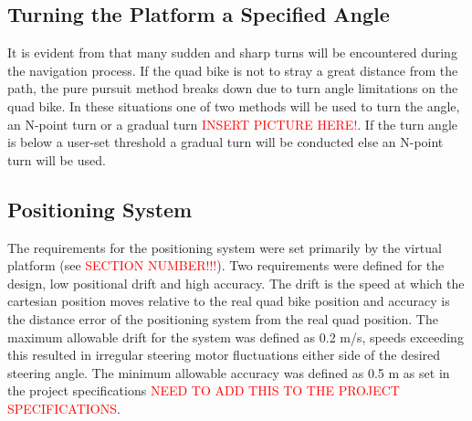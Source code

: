 \documentclass[main.tex]{subfiles}
\begin{document}
\subsection{Turning the Platform a Specified Angle}
It is evident from  that many sudden and sharp turns will be encountered during the navigation process. If the quad bike is not to stray a great distance from the path, the pure pursuit method breaks down due to turn angle limitations on the quad bike.  In these situations one of two methods will be used to turn the angle, an N-point turn or a gradual turn \textcolor{red}{INSERT PICTURE HERE!}. If the turn angle is below a user-set threshold a gradual turn will be conducted else an N-point turn will be used.

\subsection{Positioning System}
The requirements for the positioning system were set primarily by the virtual platform (see \textcolor{red}{SECTION NUMBER!!!}). Two requirements were defined for the design, low positional drift and high accuracy. The drift is the speed at which the cartesian position moves relative to the real quad bike position and accuracy is the distance error of the positioning system from the real quad position. The maximum allowable drift for the system was defined as 0.2 m/s, speeds exceeding this resulted in irregular steering motor fluctuations either side of the desired steering angle. The minimum allowable accuracy was defined as 0.5 m as set in the project specifications \textcolor{red}{NEED TO ADD THIS TO THE PROJECT SPECIFICATIONS}.
\end{document}
